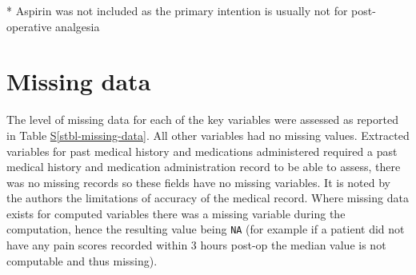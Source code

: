 \documentclass[
  letterpaper,
  DIV=11,
  numbers=noendperiod]{scrreprt}
\newcommand*\quartostblref[1]{Table \hyperref[#1]{S\ref{#1}}}
\begin{document}
* Aspirin was not included as the primary intention is usually not for
post-operative analgesia

\section{Missing data}\label{sec-sm-missing-data}

The level of missing data for each of the key variables were assessed as
reported in \quartostblref{stbl-missing-data}. All other variables had
no missing values. Extracted variables for past medical history and
medications administered required a past medical history and medication
administration record to be able to assess, there was no missing records
so these fields have no missing variables. It is noted by the authors
the limitations of accuracy of the medical record. Where missing data
exists for computed variables there was a missing variable during the
computation, hence the resulting value being \texttt{NA} (for example if
a patient did not have any pain scores recorded within 3 hours post-op
the median value is not computable and thus missing).
\end{document}

